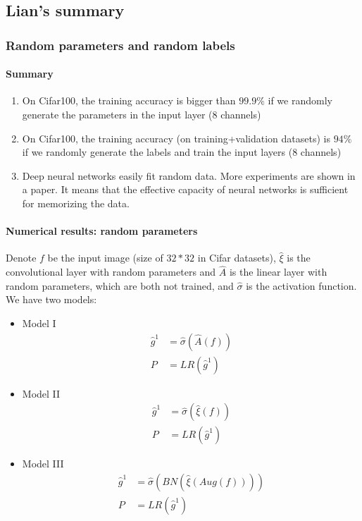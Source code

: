 \subsection{Lian's summary}

\subsubsection{Random parameters and random labels}
\paragraph{Summary}
\begin{enumerate}
\item On Cifar100, the training accuracy is bigger than $99.9\%$ if we randomly generate the parameters in the input layer (8 channels)
\item On Cifar100, the training accuracy (on training+validation datasets) is $94\%$ if we randomly generate the labels and train the input layers (8 channels)
\item Deep neural networks easily fit random data. More experiments are shown in a paper. It means that the effective capacity of neural networks is sufficient for memorizing the data.
\end{enumerate}

\paragraph{Numerical results: random parameters}
Denote $f$ be the input image (size of $32*32$ in Cifar datasets), $\hat{\xi}$ is the convolutional layer with random parameters and $\hat{A}$ is the linear layer with random parameters, which are both not trained, and $\hat{\sigma}$ is the activation function.
We have two models:
\begin{itemize}
\item Model I
\begin{align}
	\hat{g}^1 & = \hat{\sigma}(\hat{A} (f))  \label{random conv eq} \\
	P & = LR(\hat{g}^1)
\end{align}
\item Model II 
\begin{align}
\hat{g}^1 & = \hat{\sigma}(\hat{\xi} (f))  \label{random conv eq} \\
P & = LR(\hat{g}^1)
\end{align}
\item Model III
\begin{align}
\hat{g}^1 & = \hat{\sigma}(BN(\hat{\xi} (Aug(f))))  \label{random conv eq} \\
P & = LR(\hat{g}^1)
\end{align}
\end{itemize}

